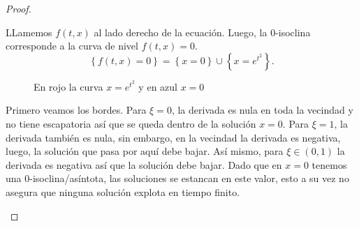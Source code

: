 \begin{proof}
\begin{plist}
    \item LLamemos \(f(t,x)\) al lado derecho de la ecuación.
    Luego, la 0-isoclina corresponde a la curva de nivel \(f(t,x) = 0\).
    \[
        \left\{ f(t,x) = 0 \right\}
        =
        \left\{
            x = 0
        \right\}
        \cup
        \left\{
            x = e^{t^2}
        \right\}
    .\]
    \begin{figure}[H]
    \centering
    \caption{En rojo la curva \(x = e^{t^2}\) y en azul \(x = 0\)}
    \end{figure}

    \item Primero veamos los bordes. Para \(\xi = 0\), la derivada es nula en
    toda la vecindad y no tiene escapatoria así que se queda dentro de la
    solución \(x=0\). Para \(\xi = 1\), la derivada también es nula, sin
    embargo, en la vecindad la derivada es negativa, luego, la solución que pasa
    por aquí debe bajar. Así mismo, para \(\xi \in (0,1)\) la derivada es
    negativa así que la solución debe bajar. Dado que en \(x = 0\) tenemos una
    0-isoclina/asíntota, las soluciones se estancan en este valor, esto a su vez
    no asegura que ninguna solución explota en tiempo finito.


\end{plist}
\end{proof}
